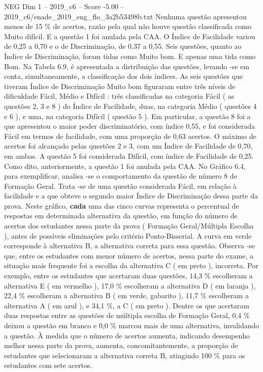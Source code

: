 \begin{textsample}{NEG Dim 1 – 2019\_c6 – Score -5.00 – 2019\_c6/enade\_2019\_eng\_flo\_3a2b53498b.txt}
Nenhuma questão apresentou menos de 15 \% de acertos, razão pela qual não houve questão classificada como Muito difícil.
E a questão 1 foi anulada pela CAA.
O Índice de Facilidade variou de 0,25 a 0,70 e o de Discriminação, de 0,37 a 0,55.
Seis questões, quanto ao Índice de Discriminação, foram tidas como Muito bom.
E apenas uma tida como Bom.
Na Tabela 6.9, é apresentada a distribuição das questões, levando -se em conta, simultaneamente, a classificação dos dois índices.
As seis questões que tiveram Índice de Discriminação Muito bom figuraram entre três níveis de dificuldade Fácil, Médio e Difícil : três classificadas na categoria Fácil ( as questões 2, 3 e 8 ) do Índice de Facilidade, duas, na categoria Médio ( questões 4 e 6 ), e uma, na categoria Difícil ( questão 5 ).
Em particular, a questão 8 foi a que apresentou o maior poder discriminatório, com índice 0,55, e foi considerada Fácil em termos de facilidade, com uma proporção de 0,63 acertos.
O máximo de acertos foi alcançado pelas questões 2 e 3, com um Índice de Facilidade de 0,70, em ambas.
A questão 5 foi considerada Difícil, com índice de Facilidade de 0,25.
Como dito, anteriormente, a questão 1 foi anulada pela CAA.
No Gráfico 6.4, para exemplificar, analisa -se o comportamento da questão de número 8 de Formação Geral.
Trata -se de uma questão considerada Fácil, em relação à facilidade e a que obteve o segundo maior Índice de Discriminação dessa parte da prova.
Neste gráfico, \textbf{cada} uma das cinco curvas representa o percentual de respostas em determinada alternativa da questão, em função do número de acertos dos estudantes nessa parte da prova ( Formação Geral/Múltipla Escolha ), antes de possíveis eliminações pelo critério Ponto-Bisserial.
A curva em verde corresponde à alternativa B, a alternativa correta para essa questão.
Observa -se que, entre os estudantes com menor número de acertos, nessa parte do exame, a situação mais frequente foi a escolha da alternativa C ( em preto ), incorreta.
Por exemplo, entre os estudantes que acertaram duas questões, 14,3 \% escolheram a alternativa E ( em vermelho ), 17,0 \% escolheram a alternativa D ( em laranja ), 22,4 \% escolheram a alternativa B ( em verde, gabarito ), 11,7 \% escolheram a alternativa A ( em azul ), e 34,1 \%, a C ( em preto ).
Dentre os que acertaram duas respostas entre as questões de múltipla escolha de Formação Geral, 0,4 \% deixou a questão em branco e 0,0 \% marcou mais de uma alternativa, invalidando a questão.
À medida que o número de acertos aumenta, indicando desempenho melhor nessa parte da prova, aumenta, concomitantemente, a proporção de estudantes que selecionaram a alternativa correta B, atingindo 100 \% para os estudantes com sete acertos.

\end{textsample}
